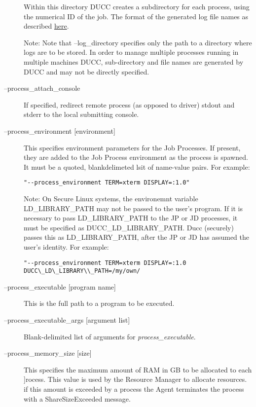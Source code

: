 \begin{description}
          Within this directory DUCC creates a subdirectory for each process, using the numerical 
          ID of the job. The format of the generated log file names as described
          \hyperref[chap:job-logs]{here}.
          
          Note: Note that --log\_directory specifies only the path to a directory where 
          logs are to be stored. In order to manage multiple processes running in multiple 
          machines DUCC, sub-directory and file names are generated by DUCC and may 
          not be directly specified. 

        \item[--process\_attach\_console] If specified, redirect remote process (as
          opposed to driver) stdout and stderr to the local submitting console.
          
        \item[--process\_environment {[environment]} ] This specifies environment parameters for the
          Job Processes. If present, they are added to the Job Process environment as the process is
          spawned. It must be a quoted, blankdelimeted lsit of name-value pairs. For example:
\begin{verbatim}
"--process_environment TERM=xterm DISPLAY=:1.0" 
\end{verbatim}
          
          Note: On Secure Linux systems, the environemnt variable 
          LD\_LIBRARY\_PATH may not be passed to the user's program. If it is 
          necessary to pass LD\_LIBRARY\_PATH to the JP or JD processes, it must be 
          specified as DUCC\_LD\_LIBRARY\_PATH. Ducc (securely) passes this as 
          LD\_LIBRARY\_PATH, after the JP or JD has assumed the user's identity. For 
          example: 
          
\begin{verbatim}
"--process_environment TERM=xterm DISPLAY=:1.0 DUCC\_LD\_LIBRARY\\_PATH=/my/own/
\end{verbatim}

        \item[--process\_executable {[program name]}] This is the full path to a program to be
          executed.

        \item[--process\_executable\_args {[argument list]}] Blank-delimited list of arguments for
          {\em process\_executable}.

        \item[--process\_memory\_size {[size]} ] This specifies the maximum amount of RAM in GB to
          be allocated to each ]rocess.  This value is used by the Resource Manager to allocate
          resources. if this amount is exceeded by a process the Agent terminates the process with a
          ShareSizeExceeded message.


\end{description}
